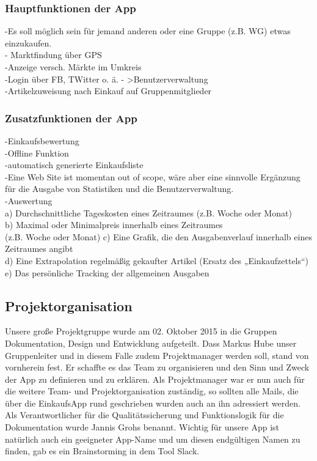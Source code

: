 \documentclass[12pt,a4paper]{article}
\begin{document}
\subsubsection{Hauptfunktionen der App}

-Es soll möglich sein für jemand anderen oder eine Gruppe (z.B. WG) etwas einzukaufen. \\
- Marktfindung über GPS \\
-Anzeige versch. Märkte im Umkreis\\
-Login über FB, TWitter o. ä. - >Benutzerverwaltung\\
-Artikelzuweisung nach Einkauf auf Gruppenmitglieder\\

\subsubsection{Zusatzfunktionen der App}
-Einkaufsbewertung\\
-Offline Funktion\\
-automatisch generierte Einkaufsliste\\
-Eine Web Site ist momentan out of scope, wäre aber eine sinnvolle Ergänzung für die Ausgabe von Statistiken und die Benutzerverwaltung.\\
-Auswertung\\
 a) Durchschnittliche Tageskosten eines Zeitraumes (z.B. Woche oder Monat) \\
 b) Maximal oder Minimalpreis innerhalb eines Zeitraumes\\ (z.B. Woche oder Monat) 
 c) Eine Grafik, die den Ausgabenverlauf innerhalb eines Zeitraumes angibt \\
 d) Eine Extrapolation regelmäßig gekaufter Artikel (Ersatz des „Einkaufzettels“) \\
 e) Das persönliche Tracking der allgemeinen Ausgaben \\

\newpage
\subsection{Projektorganisation}
Unsere große Projektgruppe wurde am 02. Oktober 2015 in die Gruppen Dokumentation, Design und Entwicklung aufgeteilt.
Dass Markus Hube unser Gruppenleiter und in diesem Falle zudem Projektmanager werden soll, stand von vornherein fest.
Er schaffte es das Team zu organisieren und den Sinn und Zweck der App zu definieren und zu erklären. Als Projektmanager war er nun auch für die weitere Team- und Projektorganisation zuständig, so sollten alle Mails, die über die EinkaufsApp rund geschrieben wurden auch an ihn adressiert werden.
Als Verantwortlicher für die Qualitätssicherung und Funktionslogik für die Dokumentation wurde Jannis Grohs benannt.
Wichtig für unsere App ist natürlich auch ein geeigneter App-Name und um diesen endgültigen Namen zu finden, gab es ein Brainstorming in dem Tool Slack.
\end{document}
